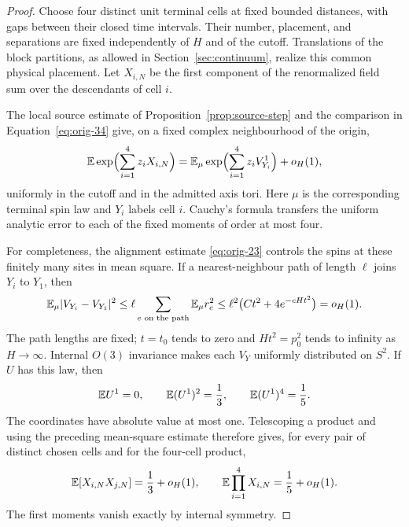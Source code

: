 \begin{proof}
Choose four distinct unit terminal cells at fixed bounded distances,
with gaps between their closed time intervals.  Their number,
placement, and separations are fixed independently of $H$ and of the
cutoff.  Translations of the block partitions, as allowed in
Section~\ref{sec:continuum}, realize this common physical placement.
Let $X_{i,N}$ be the first component of the renormalized field sum over
the descendants of cell $i$.

The local source estimate of Proposition~\ref{prop:source-step} and
the comparison in Equation~\eqref{eq:orig-34} give, on a fixed complex
neighbourhood of the origin,
\begin{equation}
 \mathbb E\exp\Bigl(\sum_{i=1}^4 z_iX_{i,N}\Bigr)
   =\mathbb E_\mu\exp\Bigl(\sum_{i=1}^4 z_iV_{Y_i}^1\Bigr)+o_H(1),
 \label{eq:cell-generating-comparison}
\end{equation}
uniformly in the cutoff and in the admitted axis tori.  Here $\mu$ is
the corresponding terminal spin law and $Y_i$ labels cell $i$.
Cauchy's formula transfers the uniform analytic error to each of the
fixed moments of order at most four.

For completeness, the alignment estimate
\eqref{eq:orig-23} controls the spins at these finitely many sites in
mean square.  If a nearest-neighbour path of length $\ell$ joins $Y_i$
to $Y_1$, then
\[
 \mathbb E_\mu|V_{Y_i}-V_{Y_1}|^2
 \le \ell\sum_{e\text{ on the path}}\mathbb E_\mu r_e^2
 \le \ell^2\bigl(Ct^2+4e^{-cHt^2}\bigr)=o_H(1).
\]
The path lengths are fixed; $t=t_0$ tends to zero and $Ht^2=p_0^2$
tends to infinity as $H\to\infty$.  Internal $O(3)$ invariance makes
each $V_Y$ uniformly distributed on $S^2$.  If $U$ has this law, then
\[
 \mathbb E U^1=0,\qquad \mathbb E(U^1)^2=\frac13,
 \qquad \mathbb E(U^1)^4=\frac15.
\]
The coordinates have absolute value at most one.  Telescoping a
product and using the preceding mean-square estimate therefore gives,
for every pair of distinct chosen cells and for the four-cell product,
\begin{equation}
 \mathbb E[X_{i,N}X_{j,N}]=\frac13+o_H(1),
 \qquad
 \mathbb E\prod_{i=1}^4X_{i,N}=\frac15+o_H(1).
 \label{eq:terminal-cell-moments}
\end{equation}
The first moments vanish exactly by internal symmetry.


\end{proof}
